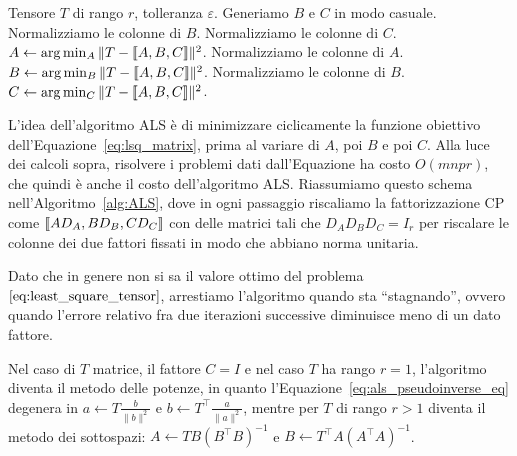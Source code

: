 \begin{algorithm}[htbp]
	\caption{Schema dell'algoritmo ALS.}
	\label{alg:ALS}
	\begin{algorithmic}[1]
		\Require Tensore $ T $ di rango $ r $, tolleranza $ \varepsilon $.
		\State Generiamo $ B $ e $ C $ in modo casuale.
		\State Normalizziamo le colonne di $ B $.
		\Repeat
		\State Normalizziamo le colonne di $ C $.
		\State $ A \gets \arg \min_{A} \| T - \dsqr{A,B,C} \|^2 $.
		\State Normalizziamo le colonne di $ A $.
		\State $ B \gets \arg \min_{B} \| T - \dsqr{A,B,C} \|^2 $.
		\State Normalizziamo le colonne di $ B $.
		\State $ C \gets \arg \min_{C} \| T - \dsqr{A,B,C} \|^2 $.
	\end{algorithmic}
\end{algorithm}

L'idea dell'algoritmo ALS è di minimizzare ciclicamente la funzione obiettivo
dell'Equazione~\eqref{eq:lsq_matrix}, prima al variare di $ A $, poi $ B $ e poi $ C $. Alla luce
dei calcoli sopra, risolvere i problemi dati dall'Equazione ha costo $
	O(mnpr) $, che quindi è anche il costo dell'algoritmo ALS. Riassumiamo questo schema
nell'Algoritmo~\ref{alg:ALS}, dove in ogni passaggio riscaliamo la fattorizzazione CP come $
	\dsqr{AD_{A}, BD_{B}, CD_{C}} $ con delle
matrici tali che $ D_{A}D_{B}D_{C} = I_{r} $ per riscalare le colonne dei due fattori fissati in
modo che abbiano norma unitaria.


\begin{remark}
	Dato che in genere non si sa il valore ottimo del problema~$\eqref{eq:least_square_tensor}$,
	arrestiamo l'algoritmo quando sta ``stagnando'', ovvero quando l'errore relativo fra due iterazioni
	successive diminuisce meno di un dato fattore.
\end{remark}

\begin{remark}
	Nel caso di $ T $ matrice, il fattore $ C = I $ e nel caso $ T $ ha rango $ r=1 $, l'algoritmo diventa il
	metodo delle potenze, in quanto l'Equazione~\eqref{eq:als_pseudoinverse_eq} degenera in $ a \gets
		T \frac{b}{\|b\|^2}$ e $ b \gets T^{\top}\frac{a}{\|a\|^2} $, mentre per $ T $ di rango $ r > 1 $ diventa il metodo dei
	sottospazi: $ A \gets TB(B^{\top}B)^{-1} $ e $ B \gets T^{\top}A(A^{\top}A)^{-1} $.
\end{remark}
